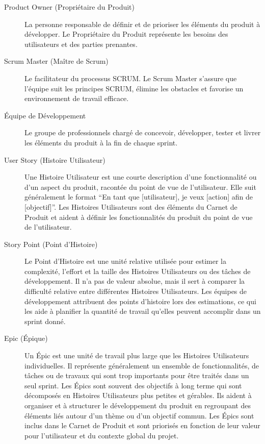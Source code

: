 \begin{description}
    \item[Product Owner (Propriétaire du Produit)] La personne responsable de définir et de prioriser les éléments du produit à développer. Le Propriétaire du Produit représente les besoins des utilisateurs et des parties prenantes.
    \item[Scrum Master (Maître de Scrum)] Le facilitateur du processus SCRUM. Le Scrum Master s'assure que l'équipe suit les principes SCRUM, élimine les obstacles et favorise un environnement de travail efficace.
    \item[Équipe de Développement] Le groupe de professionnels chargé de concevoir, développer, tester et livrer les éléments du produit à la fin de chaque sprint.
    \item[User Story (Histoire Utilisateur)] Une Histoire Utilisateur est une courte description d'une fonctionnalité ou d'un aspect du produit, racontée du point de vue de l'utilisateur. Elle suit généralement le format \foreignquote{french}{En tant que [utilisateur], je veux [action] afin de [objectif]}. Les Histoires Utilisateurs sont des éléments du Carnet de Produit et aident à définir les fonctionnalités du produit du point de vue de l'utilisateur.
    \item[Story Point (Point d'Histoire)] Le Point d'Histoire est une unité relative utilisée pour estimer la complexité, l'effort et la taille des Histoires Utilisateurs ou des tâches de développement. Il n'a pas de valeur absolue, mais il sert à comparer la difficulté relative entre différentes Histoires Utilisateurs. Les équipes de développement attribuent des points d'histoire lors des estimations, ce qui les aide à planifier la quantité de travail qu'elles peuvent accomplir dans un sprint donné.
    \item[Epic (Épique)] Un Épic est une unité de travail plus large que les Histoires Utilisateurs individuelles. Il représente généralement un ensemble de fonctionnalités, de tâches ou de travaux qui sont trop importants pour être traités dans un seul sprint. Les Épics sont souvent des objectifs à long terme qui sont décomposés en Histoires Utilisateurs plus petites et gérables. Ils aident à organiser et à structurer le développement du produit en regroupant des éléments liés autour d'un thème ou d'un objectif commun. Les Épics sont inclus dans le Carnet de Produit et sont priorisés en fonction de leur valeur pour l'utilisateur et du contexte global du projet.
\end{description}

